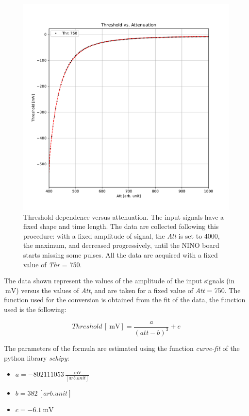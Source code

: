 \begin{figure}[hbtp]
\centering
\includegraphics[scale=0.5]{Analysis/Calibrations/ThrvsAtt.pdf}
\caption{Threshold dependence versus attenuation. The input signals have a fixed shape and time length. The data are collected following this procedure: with a fixed amplitude of signal, the \textit{Att} is set to $4000$, the maximum, and decreased progressively, until the NINO board starts missing some pulses. All the data are acquired with a fixed value of \textit{Thr} = 750.} \label{fig:ThrvsAtt}
\end{figure}

The data shown represent the values of the amplitude of the input signals (in $\SI{}{\milli \volt}$) versus the values of \textit{Att}, and are taken for a fixed value of \textit{Att} = 750. The function used for the conversion is obtained from the fit of the data, the function used is the following: 

\begin{equation}
Threshold \, [\SI{}{\milli \volt}]= \dfrac{a}{(att - b)^{3}} + c
\end{equation}

The parameters of the formula are estimated using the function \textit{curve-fit} of the python library \textit{schipy}:

\begin{itemize}
\item $a = - 802111053 \, \frac{\SI{}{\milli \volt}}{[arb.unit]}$
\item $b = 382 \, [arb. unit]$
\item $c =  \SI{-6.1}{\milli \volt}$
\end{itemize}

